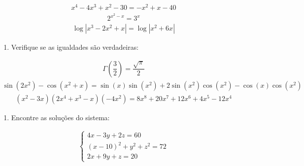 \documentclass[letterpaper,10pt,english]{jupyterBook}
\begin{document}
\begin{equation*}
\begin{split}x^4 - 4x^3 + x^2 - 30 = -x^2 + x - 40\end{split}
\end{equation*}\begin{equation*}
\begin{split}2^{x^2 -x} = 3^x\end{split}
\end{equation*}\begin{equation*}
\begin{split}\log\left|x^3 - 2x^2 +x\right| = \log\left|x^2 + 6x\right|\end{split}
\end{equation*}\begin{enumerate}
%
\item {} 
\sphinxAtStartPar
Verifique se as igualdades são verdadeiras:

\end{enumerate}
\begin{equation*}
\begin{split}\Gamma\left(\dfrac{3}{2}\right) = \dfrac{\sqrt{\pi}}{2}\end{split}
\end{equation*}\begin{equation*}
\begin{split}\sin(2x^2) - \cos(x^2 +x) = \sin{\left(x \right)} \sin{\left(x^{2} \right)} + 2 \sin{\left(x^{2} \right)} \cos{\left(x^{2} \right)} - \cos{\left(x \right)} \cos{\left(x^{2} \right)}\end{split}
\end{equation*}\begin{equation*}
\begin{split}(x^2 -3x)(2x^4 + x^3 - x)(-4x^2)= 8 x^{8} + 20 x^{7} + 12 x^{6} + 4 x^{5} - 12 x^{4}\end{split}
\end{equation*}\begin{enumerate}
%
\item {} 
\sphinxAtStartPar
Encontre as soluções do sistema:

\end{enumerate}
\begin{equation*}
\begin{split}\begin{cases}4x - 3y + 2z = 60\\ (x - 10)^2 + y^2 + z^2 = 72\\ 2x + 9y +z = 20 \end{cases}\end{split}
\end{equation*}
\end{document}
